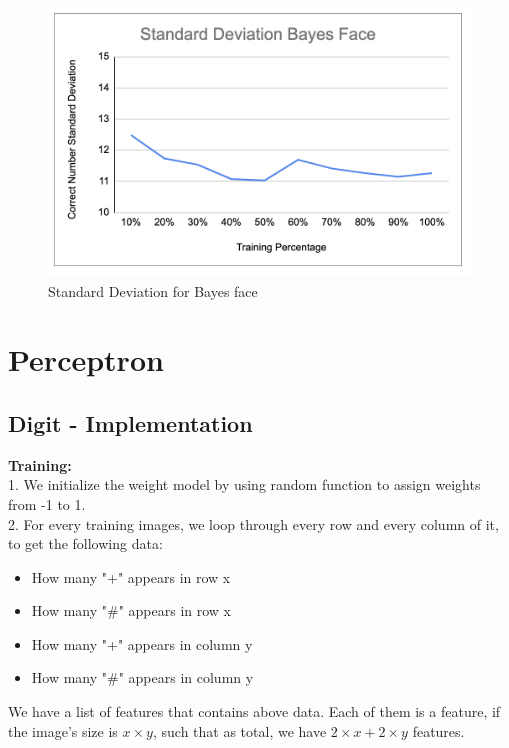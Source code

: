 \documentclass[11pt]{report}
\begin{document}
\begin{figure}[h]
\begin{center}
\includegraphics[scale=0.45]{Bayes_face_SD.png} 
\end{center}
\caption{Standard Deviation for Bayes face}
\end{figure}
\newpage


\section*{Perceptron}
\subsection*{Digit - Implementation}

\textbf{Training:} \\

1. We initialize the weight model by using random function to assign weights from -1 to 1. \\

2. For every training images, we loop through every row and every column of it, to get the following data:
 \begin{itemize}
\item How many "+" appears in row x
\item How many "\#" appears in row x
\item How many "+" appears in column y
\item How many "\#" appears in column y
\end{itemize}

We have a list of features that contains above data. Each of them is a feature, if the image's size is $x \times y$, such that as total, we have $2 \times x + 2 \times y $ features.\\
\end{document}

